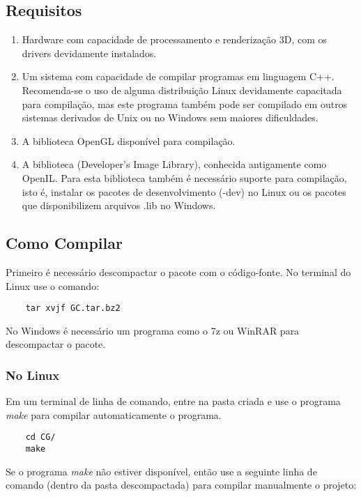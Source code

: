 \documentclass[a4paper,10pt]{article}
\begin{document}
\subsection{Requisitos}
\begin{enumerate}
	\item Hardware com capacidade de processamento e renderização 3D, com os drivers devidamente instalados.
	\item Um sistema com capacidade de compilar programas em linguagem C++. Recomenda-se o uso de alguma distribuição Linux devidamente capacitada para compilação, mas este programa também pode ser compilado em outros sistemas derivados de Unix ou no Windows sem maiores dificuldades.
	\item A biblioteca OpenGL disponível para compilação.
	\item A biblioteca  (Developer's Image Library), conhecida antigamente como OpenIL. Para esta biblioteca também é necessário suporte para compilação, isto é, instalar os pacotes de desenvolvimento (-dev) no Linux ou os pacotes que disponibilizem arquivos .lib no Windows.
\end{enumerate}


\subsection{Como Compilar}

Primeiro é necessário descompactar o pacote com o código-fonte. No terminal do Linux use o comando:
\begin{verbatim}
	tar xvjf GC.tar.bz2
\end{verbatim}

No Windows é necessário um programa como o 7z ou WinRAR para descompactar o pacote.


\subsubsection{No Linux}

Em um terminal de linha de comando, entre na pasta criada e use o programa \emph{make} para compilar automaticamente o programa.

\begin{verbatim}
	cd CG/
	make
\end{verbatim}

Se o programa \emph{make} não estiver disponível, então use a seguinte linha de comando (dentro da pasta descompactada) para compilar manualmente o projeto:
\end{document}
